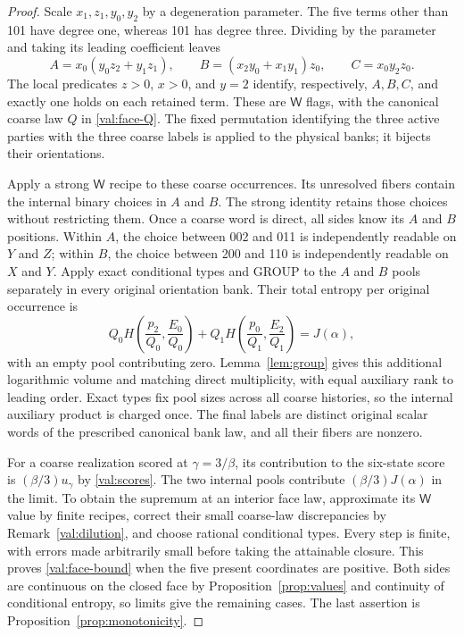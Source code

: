 \documentclass[11pt]{article}
\numberwithin{equation}{section}
\theoremstyle{definition}
\theoremstyle{remark}
\begin{document}
\begin{proof}
Scale $x_1,z_1,y_0,y_2$ by a degeneration parameter.  The five terms other
than 101 have degree one, whereas 101 has degree three.  Dividing by the
parameter and taking its leading coefficient leaves
\[
 A=x_0(y_0z_2+y_1z_1),\qquad
 B=(x_2y_0+x_1y_1)z_0,\qquad C=x_0y_2z_0.
\]
The local predicates $z>0$, $x>0$, and $y=2$ identify, respectively,
$A,B,C$, and exactly one holds on each retained term.  These are $\mathsf W$ flags,
with the canonical coarse law $Q$ in \eqref{val:face-Q}.  The fixed
permutation identifying the three active parties with the three coarse
labels is applied to the physical banks; it bijects their orientations.

Apply a strong $\mathsf W$ recipe to these coarse occurrences.  Its unresolved
fibers contain the internal binary choices in $A$ and $B$.  The strong
identity retains those choices without restricting them.  Once a coarse
word is direct, all sides know its $A$ and $B$ positions.  Within $A$, the
choice between 002 and 011 is independently readable on $Y$ and $Z$;
within $B$, the choice between 200 and 110 is independently readable on
$X$ and $Y$.  Apply exact conditional types and GROUP to the $A$ and $B$
pools separately in every original orientation bank.
Their total entropy per original occurrence is
\[
 Q_0 H\left(\frac{p_2}{Q_0},\frac{E_0}{Q_0}\right)
 +Q_1 H\left(\frac{p_0}{Q_1},\frac{E_2}{Q_1}\right)
 =J(\alpha),
\]
with an empty pool contributing zero.  Lemma~\ref{lem:group} gives this
additional logarithmic volume and matching direct multiplicity, with equal
auxiliary rank to leading order.  Exact types fix pool sizes across all
coarse histories, so the internal auxiliary product is charged once.
The final labels are distinct original scalar words of the prescribed
canonical bank law, and all their fibers are nonzero.

For a coarse realization scored at $\gamma=3/\beta$, its contribution to
the six-state score is $(\beta/3)u_\gamma$ by
\eqref{val:scores}.  The two internal pools contribute
$(\beta/3)J(\alpha)$ in the limit.  To obtain the supremum at an interior
face law, approximate its $\mathsf W$ value by finite recipes, correct their small
coarse-law discrepancies by Remark~\ref{val:dilution}, and choose rational
conditional types.  Every step is finite, with errors made arbitrarily
small before taking the attainable closure.  This proves
\eqref{val:face-bound} when the five present coordinates are positive.
Both sides are continuous on the closed face by
Proposition~\ref{prop:values} and continuity of conditional entropy, so
limits give the remaining cases.  The last assertion is
Proposition~\ref{prop:monotonicity}.
\end{proof}
\end{document}
